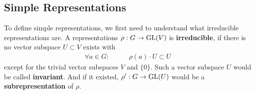 \subsection{Simple Representations}

To define simple representations, we first need to understand what irreducible representations are.
A representations $\rho: G \to \operatorname{GL}(V)$ is \textbf{irreducible}, if there is no vector subspace $U \subset V$ exists with
\begin{align*}
    \forall a \in G: \qquad & \rho(a) \cdot U \subset U
\end{align*}
except for the trivial vector subspaces $V$ and $\{0\}$.
Such a vector subspace $U$ would be called \textbf{invariant}.
And if it existed, $\rho': G \to \operatorname{GL}(U)$ would be a \textbf{subrepresentation} of $\rho$.

